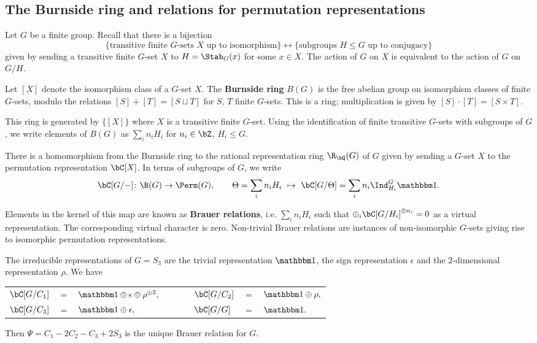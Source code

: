 \subsection{The Burnside ring and relations for permutation representations}

Let $G$ be a finite group. Recall that there is a bijection  
\[ \{ \text{transitive finite }G\text{-sets } X  \text{ up to isomorphism}\}\leftrightarrow  \{ \text{subgroups } H \leq G \text{ up to conjugacy} \} \] 
given by sending a transitive finite $G$-set $X$ to $H = \Stab_{G}(x)$ for some $x \in X$.  The action of $G$ on $X$ is equivalent to the action of $G$ on $G / H$. 

\begin{defn}\label{burnside}
Let $[X]$ denote the isomorphism class of a $G$-set $X$. 
The \textbf{Burnside ring} $B(G)$ is the free abelian group on isomorphism classes of finite $G$-sets, modulo the relations  $[S] + [T] = [S \sqcup T]$ for $S$, $T$ finite $G$-sets. This is a ring; multiplication is given by $[S] \cdot [T] = [S \times T]$.
\end{defn}

This ring is generated by $\{ [X] \}$ where $X$ is a transitive finite $G$-set. Using the identification of finite transitive $G$-sets with subgroups of $G$, we write elements of $B(G)$ as $\sum_i n_i H_i$ for $n_i \in \bZ$, $H_i \leq G$. 

\begin{notn}
There is a homomorphism from the Burnside ring to the rational representation ring $\R_{\bQ}(G)$ of $G$ given by sending a $G$-set $X$ to the permutation representation $\bC[X]$. In terms of subgroups of $G$, we write
\[ \bC[G / -] \colon \B(G) \to \Perm(G),  \qquad \Theta = \sum_i n_i H_i \ \mapsto \ \bC[G / \Theta ] = \sum_i n_i \Ind_{H_i}^G \trivial. \]
\end{notn}
Elements in the kernel of this map are known as \textbf{Brauer relations}, i.e. $\sum _i n_i H_i$ such that $\oplus_i \bC[G / H_i]^{\oplus n_i} = 0$ as a virtual representation. The corresponding virtual character is zero.  Non-trivial Brauer relations are instances of non-isomorphic $G$-sets giving rise to isomorphic permutation representations. 

\begin{example}
    The irreducible representations of $G = S_3$ are the trivial representation $\trivial$, the sign representation $\epsilon$ and the $2$-dimensional representation $\rho$.
    We have
    \begin{table}[H]
        \centering
    \begin{tabular}{l l l l l l l}
        $\bC[G / C_1]$ & $=$ & $\trivial \oplus \epsilon \oplus \rho^{\oplus 2},$ & $\qquad$ &
        $\bC[G / C_2]$ & $=$ & $\trivial \oplus \rho,$\\ 
        $\bC[G / C_3]$ & $=$ & $\trivial \oplus \epsilon,$ & $\qquad$ &
        $\bC[G / G]$ & $=$ & $\trivial.$  
    \end{tabular}
\end{table}
    Then $\Psi = C_1  - 2 C_2 - C_3 + 2S_3$ is the unique Brauer relation for $G$.
\end{example}

